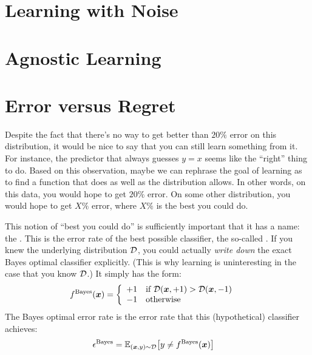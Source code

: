 \section{Learning with Noise}

\section{Agnostic Learning}

\section{Error versus Regret}


Despite the fact that there's no way to get better than $20\%$ error
on this distribution, it would be nice to say that you can still learn
something from it.  For instance, the predictor that always guesses
$y=x$ seems like the ``right'' thing to do.  Based on this
observation, maybe we can rephrase the goal of learning as to find a
function that does as well as the distribution allows.  In other
words, on this data, you would hope to get $20\%$ error.  On some other
distribution, you would hope to get $X\%$ error, where $X\%$ is the
best you could do.

This notion of ``best you could do'' is sufficiently important that it
has a name: the .  This is the error rate of
the best possible classifier, the so-called .  If you knew the underlying distribution $\mathcal{D}$, you
could actually \emph{write down} the exact Bayes optimal classifier
explicitly.  (This is why learning is uninteresting in the case that
you know $\mathcal{D}$.)  It simply has the form:
%
\begin{align}
f^{\text{Bayes}}({\boldsymbol{x}}) &=
 \left\{\begin{array}{ll} +1 & \text{if } \mathcal{D}({\boldsymbol{x}},+1) > \mathcal{D}({\boldsymbol{x}},-1) \\
         -1 & \text{otherwise}\end{array}\right.
\end{align}
%
The Bayes optimal error rate is the error rate that this
(hypothetical) classifier achieves:
%
\begin{align}
\epsilon^{\text{Bayes}} &=
  \mathbb{E}_{({\boldsymbol{x}},y) \sim \mathcal{D}} \big[ y \neq f^{\text{Bayes}}({\boldsymbol{x}}) \big]
\end{align}





\begin{exercises}
\begin{Ex}
\TODO

\begin{solution}
\TODO
\end{solution}
\end{Ex}

\end{exercises}

